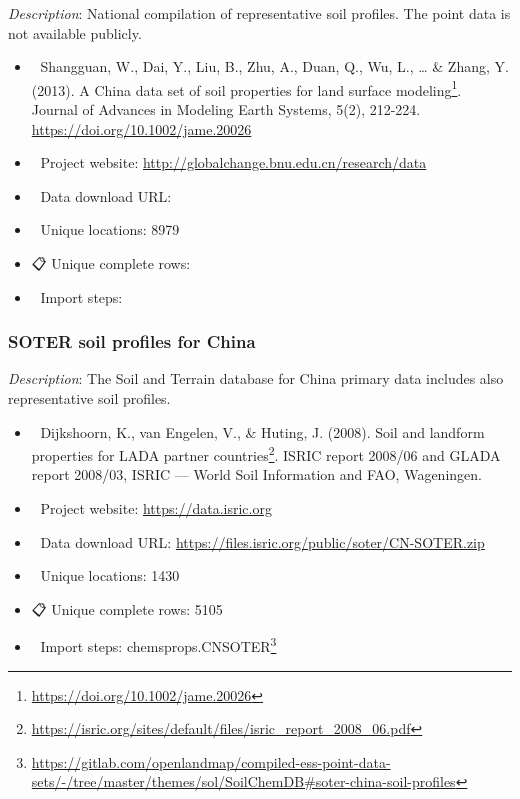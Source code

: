 \documentclass[
  graybox,natbib,nospthms]{svmono}
\providecommand{\tightlist}{%
  \setlength{\itemsep}{0pt}\setlength{\parskip}{0pt}}
\providecommand{\tightlist}{\setlength{\itemsep}{0pt}\setlength{\parskip}{0pt}}
\renewcommand{\href}[2]{#2 (\url{#1})}
\renewcommand{\href}[2]{#2\footnote{\url{#1}}}
\begin{document}
\emph{Description}: National compilation of representative soil profiles. The point data is
not available publicly.

\begin{itemize}
\tightlist
\item
  📕 Shangguan, W., Dai, Y., Liu, B., Zhu, A., Duan, Q., Wu, L., \ldots{} \& Zhang, Y. (2013). \href{https://doi.org/10.1002/jame.20026}{A China data set of soil properties for land surface modeling}. Journal of Advances in Modeling Earth Systems, 5(2), 212-224. \url{https://doi.org/10.1002/jame.20026}\\
\item
  🔗 Project website: \url{http://globalchange.bnu.edu.cn/research/data}\\
\item
  📂 Data download URL:\\
\item
  📍 Unique locations: 8979\\
\item
  📋 Unique complete rows:\\
\item
  📝 Import steps:
\end{itemize}

\hypertarget{soter-soil-profiles-for-china}{%
\subsubsection{SOTER soil profiles for China}\label{soter-soil-profiles-for-china}}

\emph{Description}: The Soil and Terrain database for China primary data includes also
representative soil profiles.

\begin{itemize}
\tightlist
\item
  📕 Dijkshoorn, K., van Engelen, V., \& Huting, J. (2008). \href{https://isric.org/sites/default/files/isric_report_2008_06.pdf}{Soil and landform properties for LADA partner countries}. ISRIC report 2008/06 and GLADA report 2008/03, ISRIC --- World Soil Information and FAO, Wageningen.\\
\item
  🔗 Project website: \url{https://data.isric.org}\\
\item
  📂 Data download URL: \url{https://files.isric.org/public/soter/CN-SOTER.zip}\\
\item
  📍 Unique locations: 1430\\
\item
  📋 Unique complete rows: 5105\\
\item
  📝 Import steps: \href{https://gitlab.com/openlandmap/compiled-ess-point-data-sets/-/tree/master/themes/sol/SoilChemDB\#soter-china-soil-profiles}{chemsprops.CNSOTER}
\end{itemize}
\end{document}
